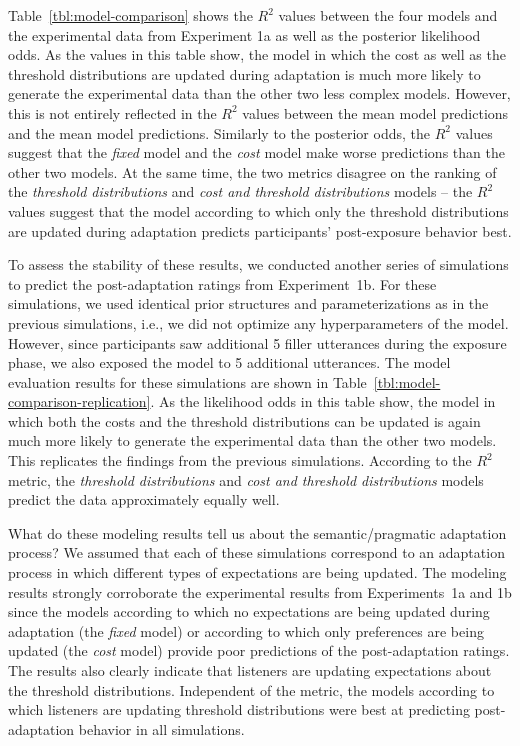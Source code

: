 \documentclass[lucida,biblatex]{sp} %
\begin{document}
Table~\ref{tbl:model-comparison} shows the $R^2$ values between the four models and the experimental data from Experiment 1a 
as well as the posterior likelihood odds. As the values in this table show, the model in which the cost as well as the threshold 
 distributions are updated during adaptation is much more likely to generate the experimental data than the other 
 two less complex models. However, this is not entirely reflected in the $R^2$ values between the mean model predictions
 and the mean model predictions. Similarly to the posterior odds, the $R^2$ values suggest that the \textit{fixed} model
 and the \textit{cost} model make worse predictions than the other two models. At the same time, the two metrics disagree on the 
 ranking of the \textit{threshold distributions} and \textit{cost and threshold distributions} models -- the $R^2$ values suggest
 that the model according to which only the threshold distributions are updated during adaptation predicts 
 participants' post-exposure behavior best.
 
 To assess the stability of these results, we conducted another series of simulations to predict the post-adaptation
 ratings from Experiment~1b. For these simulations, we used identical prior structures and parameterizations as in
 the previous simulations, i.e., we did not optimize any hyperparameters of the model. However, 
 since participants saw additional 5 filler utterances during the exposure phase, we also exposed the model to 5 additional utterances. 
 The model 
evaluation results for these simulations are shown in Table~\ref{tbl:model-comparison-replication}. As the likelihood odds
in this table show, the model in which both the costs and the threshold distributions can be updated is again much more
likely to generate the experimental data than the other two models. This replicates the findings from the previous simulations.
According to the $R^2$ metric, the \textit{threshold distributions} and \textit{cost and threshold distributions} models predict
the data approximately equally well.

What do these modeling results tell us about the semantic/pragmatic adaptation process? 
We assumed that each of these simulations
correspond to an adaptation process in which different types of expectations are being updated.
The modeling results strongly corroborate the experimental results from Experiments~1a and 1b since
the models according to which no expectations are being updated during adaptation (the \textit{fixed} model) 
or according to which only preferences are being updated (the \textit{cost} model) provide poor predictions of the post-adaptation
ratings. The results also clearly indicate that listeners are updating expectations about the threshold distributions. Independent of
the metric, the models according to which listeners are updating threshold distributions were best at predicting post-adaptation
behavior in all simulations. 
\end{document}
